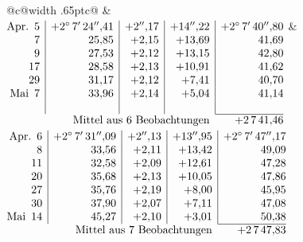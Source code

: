 \noindent\begin{tabular}{@{}c@{\hspace{.4em}\vrule width .65pt\hspace{.4em}}c@{}}
 &
 \\[.18ex]
\(\begin{array}[t]{@{}r|r|r|r|r@{}}
\text{Apr.}\enspace 5 & +2^\circ\,7'\,24''{,}41 & +2''{,}17 & +14''{,}22 & +2^\circ\,7'\,40''{,}80\\
7 & 25{,}85 & +2{,}15 & +13{,}69 & 41{,}69\\
9 & 27{,}53 & +2{,}12 & +13{,}15 & 42{,}80\\
17 & 28{,}58 & +2{,}13 & +10{,}91 & 41{,}62\\
29 & 31{,}17 & +2{,}12 & +7{,}41 & 40{,}70\\
\text{Mai}\enspace 7 & 33{,}96 & +2{,}14 & +5{,}04 & 41{,}14\\
 & & & & \\
\cline{5-5}
\multicolumn{4}{r}{\text{Mittel aus 6 Beobachtungen}} & +2\,7\,41{,}46
\end{array}\)
&
\(\begin{array}[t]{@{}r|r|r|r|r@{}}
\text{Apr.}\enspace 6 & +2^\circ\,7'\,31''{,}09 & +2''{,}13 & +13''{,}95 & +2^\circ\,7'\,47''{,}17\\
8 & 33{,}56 & +2{,}11 & +13{,}42 & 49{,}09\\
11 & 32{,}58 & +2{,}09 & +12{,}61 & 47{,}28\\
20 & 35{,}68 & +2{,}13 & +10{,}05 & 47{,}86\\
27 & 35{,}76 & +2{,}19 & +8{,}00 & 45{,}95\\
30 & 37{,}90 & +2{,}07 & +7{,}11 & 47{,}08\\
\text{Mai}\enspace 14 & 45{,}27 & +2{,}10 & +3{,}01 & 50{,}38\\
\cline{5-5}
\multicolumn{4}{r}{\text{Mittel aus 7 Beobachtungen}} & +2\,7\,47{,}83
\end{array}\)
\end{tabular}\par\medskip
